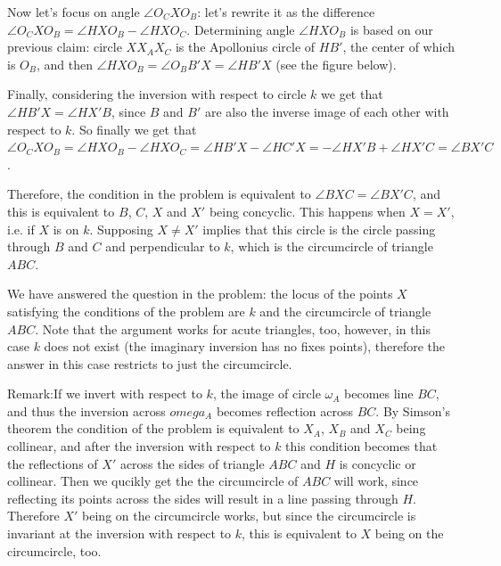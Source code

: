\documentclass{article}
\begin{document}
Now let's focus on angle \(\displaystyle \angle O_CXO_B\): let's rewrite it as the difference \(\displaystyle \angle O_CXO_B = \angle HXO_B - \angle HXO_C\). Determining angle \(\displaystyle \angle HXO_B\) is based on our previous claim: circle \(\displaystyle XX_AX_C\) is the Apollonius circle of \(\displaystyle HB'\), the center of which is \(\displaystyle O_B\), and then \(\displaystyle \angle HXO_B = \angle O_BB'X = \angle HB'X\) (see the figure below).

Finally, considering the inversion with respect to circle \(\displaystyle k\) we get that \(\displaystyle \angle HB'X = \angle HX'B\), since \(\displaystyle B\) and \(\displaystyle B'\) are also the inverse image of each other with respect to \(\displaystyle k\). So finally we get that \(\displaystyle \angle O_CXO_B = \angle HXO_B - \angle HXO_C = \angle HB'X - \angle HC'X = - \angle HX'B + \angle HX'C = \angle BX'C\).

Therefore, the condition in the problem is equivalent to \(\displaystyle \angle BXC = \angle BX'C\), and this is equivalent to \(\displaystyle B\), \(\displaystyle C\), \(\displaystyle X\) and \(\displaystyle X'\) being concyclic. This happens when \(\displaystyle X = X'\), i.e. if \(\displaystyle X\) is on \(\displaystyle k\). Supposing \(\displaystyle X \neq X'\) implies that this circle is the circle passing through \(\displaystyle B\) and \(\displaystyle C\) and perpendicular to \(\displaystyle k\), which is the circumcircle of triangle \(\displaystyle ABC\).

We have answered the question in the problem: the locus of the points \(\displaystyle X\) satisfying the conditions of the problem are \(\displaystyle k\) and the circumcircle of triangle \(\displaystyle ABC\). Note that the argument works for acute triangles, too, however, in this case \(\displaystyle k\) does not exist (the imaginary inversion has no fixes points), therefore the answer in this case restricts to just the circumcircle.

Remark:If we invert with respect to \(\displaystyle k\), the image of circle \(\displaystyle \omega_A\) becomes line \(\displaystyle BC\), and thus the inversion across \(\displaystyle omega_A\) becomes reflection across \(\displaystyle BC\). By Simson's theorem the condition of the problem is equivalent to \(\displaystyle X_A\), \(\displaystyle X_B\) and \(\displaystyle X_C\) being collinear, and after the inversion with respect to \(\displaystyle k\) this condition becomes that the reflections of \(\displaystyle X'\) across the sides of triangle \(\displaystyle ABC\) and \(\displaystyle H\) is concyclic or collinear. Then we qucikly get the the circumcircle of \(\displaystyle ABC\) will work, since reflecting its points across the sides will result in a line passing through \(\displaystyle H\). Therefore \(\displaystyle X'\) being on the circumcircle works, but since the circumcircle is invariant at the inversion with respect to \(\displaystyle k\), this is equivalent to \(\displaystyle X\) being on the circumcircle, too.
\end{document}
